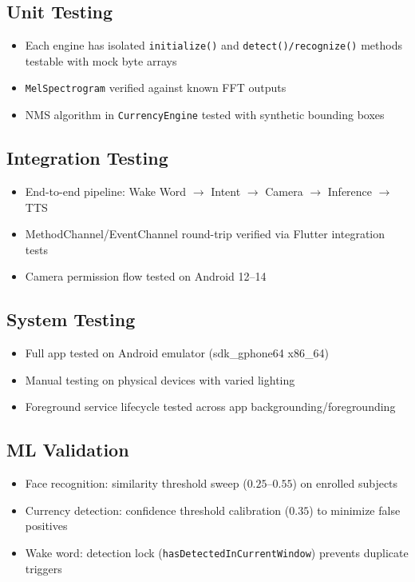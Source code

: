 \documentclass[12pt,a4paper]{article}
\begin{document}
\subsection{Unit Testing}
\begin{itemize}
  \item Each engine has isolated \texttt{initialize()} and \texttt{detect()/recognize()} methods testable with mock byte arrays
  \item \texttt{MelSpectrogram} verified against known FFT outputs
  \item NMS algorithm in \texttt{CurrencyEngine} tested with synthetic bounding boxes
\end{itemize}

\subsection{Integration Testing}
\begin{itemize}
  \item End-to-end pipeline: Wake Word $\rightarrow$ Intent $\rightarrow$ Camera $\rightarrow$ Inference $\rightarrow$ TTS
  \item MethodChannel/EventChannel round-trip verified via Flutter integration tests
  \item Camera permission flow tested on Android 12--14
\end{itemize}

\subsection{System Testing}
\begin{itemize}
  \item Full app tested on Android emulator (sdk\_gphone64 x86\_64)
  \item Manual testing on physical devices with varied lighting
  \item Foreground service lifecycle tested across app backgrounding/foregrounding
\end{itemize}

\subsection{ML Validation}
\begin{itemize}
  \item Face recognition: similarity threshold sweep ($0.25$--$0.55$) on enrolled subjects
  \item Currency detection: confidence threshold calibration ($0.35$) to minimize false positives
  \item Wake word: detection lock (\texttt{hasDetectedInCurrentWindow}) prevents duplicate triggers
\end{itemize}
\end{document}

